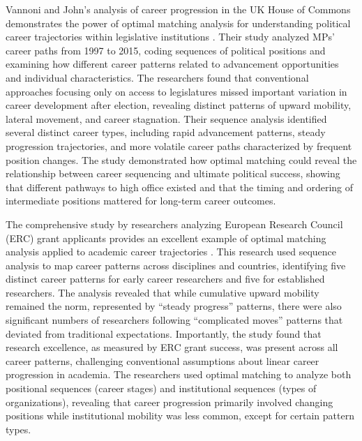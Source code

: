 \documentclass[../main.tex]{subfiles}
\begin{document}
Vannoni and John's analysis of career progression in the UK House of Commons demonstrates the power of optimal matching analysis for understanding political career trajectories within legislative institutions \citep{vannoni_john_career_progression}. Their study analyzed MPs' career paths from 1997 to 2015, coding sequences of political positions and examining how different career patterns related to advancement opportunities and individual characteristics. The researchers found that conventional approaches focusing only on access to legislatures missed important variation in career development after election, revealing distinct patterns of upward mobility, lateral movement, and career stagnation. Their sequence analysis identified several distinct career types, including rapid advancement patterns, steady progression trajectories, and more volatile career paths characterized by frequent position changes. The study demonstrated how optimal matching could reveal the relationship between career sequencing and ultimate political success, showing that different pathways to high office existed and that the timing and ordering of intermediate positions mattered for long-term career outcomes.

The comprehensive study by researchers analyzing European Research Council (ERC) grant applicants provides an excellent example of optimal matching analysis applied to academic career trajectories \citep{mapping_career_patterns}. This research used sequence analysis to map career patterns across disciplines and countries, identifying five distinct career patterns for early career researchers and five for established researchers. The analysis revealed that while cumulative upward mobility remained the norm, represented by ``steady progress'' patterns, there were also significant numbers of researchers following ``complicated moves'' patterns that deviated from traditional expectations. Importantly, the study found that research excellence, as measured by ERC grant success, was present across all career patterns, challenging conventional assumptions about linear career progression in academia. The researchers used optimal matching to analyze both positional sequences (career stages) and institutional sequences (types of organizations), revealing that career progression primarily involved changing positions while institutional mobility was less common, except for certain pattern types.
\end{document}

